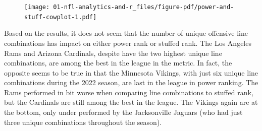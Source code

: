 \documentclass[
  letterpaper,
]{krantz}
\begin{document}
\begin{figure}[H]

{\centering \texttt{[image: 01-nfl-analytics-and-r\_files/figure-pdf/power-and-stuff-cowplot-1.pdf]}

}

\end{figure}

Based on the results, it does not seem that the number of unique
offensive line combinations has impact on either power rank or stuffed
rank. The Los Angeles Rams and Arizona Cardinals, despite have the two
highest unique line combinations, are among the best in the league in
the metric. In fact, the opposite seems to be true in that the Minnesota
Vikings, with just six unique line combinations during the 2022 season,
are last in the league in power ranking. The Rams performed in bit worse
when comparing line combinations to stuffed rank, but the Cardinals are
still among the best in the league. The Vikings again are at the bottom,
only under performed by the Jacksonville Jaguars (who had just three
unique combinations throughout the season).
\end{document}
